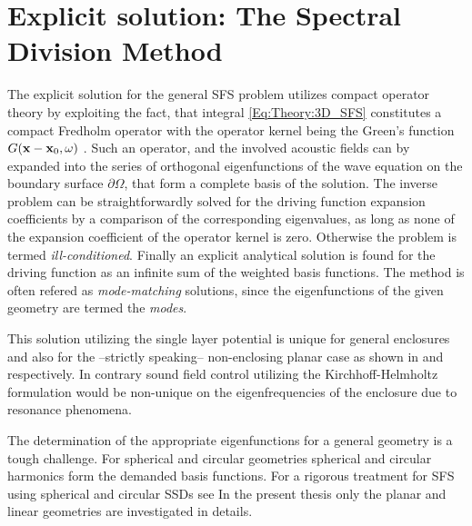 

\newpage
\section{Explicit solution: The Spectral Division Method}

The explicit solution for the general SFS problem utilizes compact operator theory by exploiting the fact, that integral \ref{Eq:Theory:3D_SFS} constitutes a compact Fredholm operator with the operator kernel being the Green's function $G(\mathbf{x} - \mathbf{x}_0 , \omega )$ \cite{Ahrens2012,MorseFeshbach1953}.
Such an operator, and the involved acoustic fields can by expanded into the series of orthogonal eigenfunctions of the wave equation on the boundary surface $\partial \Omega$, that form a complete basis of the solution. The inverse problem can be straightforwardly solved for the driving function expansion coefficients by a comparison of the corresponding eigenvalues, as long as none of the expansion coefficient of the operator kernel is zero. Otherwise the problem is termed \emph{ill-conditioned}. 
Finally an explicit analytical solution is found for the driving function as an infinite sum of the weighted basis functions.
The method is often refered as \emph{mode-matching} solutions, since the eigenfunctions of the given geometry are termed the \emph{modes}.

This solution utilizing the single layer potential is unique for general enclosures and also for the --strictly speaking-- non-enclosing planar case as shown in \cite{Zotter2013:uniqueness} and \cite{Fazi2010} respectively. In contrary sound field control utilizing the Kirchhoff-Helmholtz formulation would be non-unique on the eigenfrequencies of the enclosure due to resonance phenomena.

The determination of the appropriate eigenfunctions for a general geometry is a tough challenge.
For spherical and circular geometries spherical and circular harmonics form the demanded basis functions. For a rigorous treatment for SFS using spherical and circular SSDs see \cite{Ahrens2010phd,Zotter2009phd,Ahrens2012,Ahrens2009:circularSSD_mismatch,Ahrens2009:circular25D_SFR,Ahrens2008:Analytical_Circ_Spherical_SFS}
In the present thesis only the planar and linear geometries are investigated in details.

